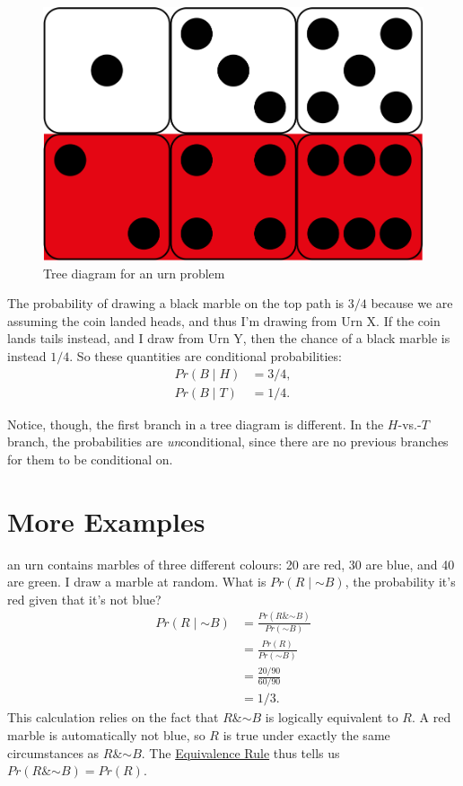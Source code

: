 \documentclass[justified]{tufte-book}
\newcommand{\given}{\mid}
\renewcommand{\neg}{\mathbin{\sim}}
\renewcommand{\wedge}{\mathbin{\&}}
\newcommand{\p}{Pr}
\theoremstyle{definition}
\theoremstyle{definition}
\theoremstyle{definition}
\theoremstyle{remark}
\begin{document}
\begin{figure}
\includegraphics{_main_files/figure-latex/unnamed-chunk-61-1} \caption[Tree diagram for an urn problem]{Tree diagram for an urn problem}\label{fig:unnamed-chunk-61}
\end{figure}

The probability of drawing a black marble on the top path is \(3/4\)
because we are assuming the coin landed heads, and thus I'm drawing from
Urn X. If the coin lands tails instead, and I draw from Urn Y, then the
chance of a black marble is instead \(1/4\). So these quantities are
conditional probabilities: \[
  \begin{aligned}
    \p(B \given H) &= 3/4,\\
    \p(B \given T) &= 1/4.
  \end{aligned}
\]

Notice, though, the first branch in a tree diagram is different. In the
\(H\)-vs.-\(T\) branch, the probabilities are \emph{un}conditional,
since there are no previous branches for them to be conditional on.

\hypertarget{more-examples}{%
\section{More Examples}\label{more-examples}}

 an urn contains marbles of three different colours:
20 are red, 30 are blue, and 40 are green. I draw a marble at random.
What is \(\p(R \given \neg B)\), the probability it's red given that
it's not blue? \[
  \begin{aligned}
    \p(R \given \neg B) &= \frac{\p(R \wedge \neg B)}{\p(\neg B)}\\
                        &= \frac{\p(R)}{\p(\neg B)}\\
                        &= \frac{20/90}{60/90}\\
                        &= 1/3.
  \end{aligned}
\] This calculation relies on the fact that \(R \wedge \neg B\) is
logically equivalent to \(R\). A red marble is automatically not blue,
so \(R\) is true under exactly the same circumstances as
\(R \wedge \neg B\). The
\protect\hyperlink{tautologies-contradictions-and-equivalent-propositions}{Equivalence
Rule} thus tells us \(\p(R \wedge \neg B) = \p(R)\).
\end{document}
